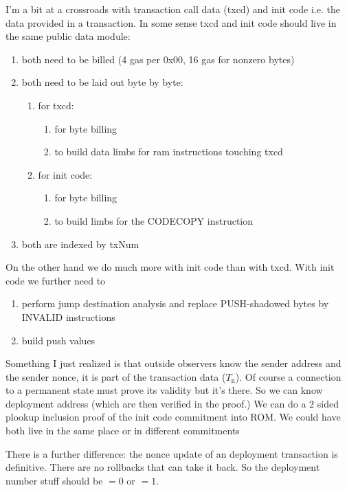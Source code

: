 I'm a bit at a crossroads with transaction call data (txcd) and init code i.e. the data provided in a transaction. In some sense txcd and init code should live in the same public data module:

\begin{enumerate}
\item both need to be billed (4 gas per 0x00, 16 gas for nonzero bytes)
\item both need to be laid out byte by byte:
\begin{enumerate}
	\item for txcd:
	\begin{enumerate}
		\item for byte billing
		\item to build data limbs for ram instructions touching txcd
	\end{enumerate}
	\item for init code:
	\begin{enumerate}
		\item for byte billing
		\item to build limbs for the CODECOPY instruction
	\end{enumerate}
\end{enumerate}
\item both are indexed by txNum
\end{enumerate}

On the other hand we do much more with init code than with txcd. With init code we further need to

\begin{enumerate}
	\item perform jump destination analysis and replace PUSH-shadowed bytes by INVALID instructions
	\item build push values
\end{enumerate}

Something I just realized is that outside observers know the sender address and the sender nonce, it is part of the transaction data ($T_\text{n}$). Of course a connection to a permanent state must prove its validity but it's there. So we can know deployment address (which are then verified in the proof.) We can do a 2 sided plookup inclusion proof of the init code commitment into ROM. We could have both live in the same place or in different commitments

There is a further difference: the nonce update of an deployment transaction is definitive. There are no rollbacks that can take it back. So the deployment number stuff should be $=0$ or $=1$.

